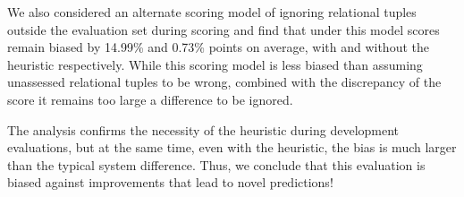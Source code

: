 We also considered an alternate scoring model of ignoring relational tuples outside the evaluation set during scoring and find that under this model \fone{} scores remain biased by 14.99\% and 0.73\% points on average, with and without the \anydoc{} heuristic respectively.
While this scoring model is less biased than assuming unassessed relational tuples to be wrong, combined with the discrepancy of the \anydoc{} score it remains too large a difference to be ignored.

The analysis confirms the necessity of the \anydoc{} heuristic during development evaluations,
  but at the same time, even with the heuristic, the bias is much larger than the typical system difference.
Thus, we conclude that this evaluation is biased against improvements that lead to novel predictions!

% 
% 
